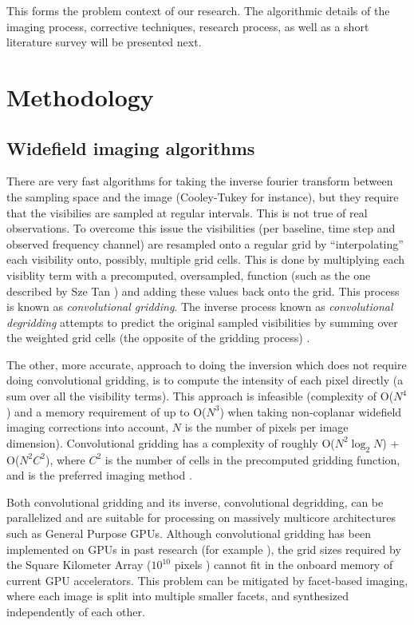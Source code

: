 \documentclass[a4paper, two column]{article}
\begin{document}
This forms the problem context of our research. The algorithmic details of the imaging process, corrective techniques, research process, as well as a short literature survey will be presented next.

\section{Methodology}
\subsection{Widefield imaging algorithms}
There are very fast algorithms for taking the inverse fourier transform between the sampling space and the image (Cooley-Tukey for instance), but they require that the visibilies are sampled at regular intervals. This 
is not true of real observations. To overcome this issue the visibilities (per baseline, time step and observed frequency channel) are resampled onto a regular grid by ``interpolating'' each visibility onto, possibly, 
multiple grid cells. This is done by multiplying each visiblity term with a precomputed, oversampled, function (such as the one described by Sze Tan \cite{tan1986aperture}) and adding these values back onto the grid. 
This process is known as \textit{convolutional gridding}. The inverse process known as \textit{convolutional degridding} attempts to predict the original sampled visibilities by summing over the weighted grid 
cells (the opposite of the gridding process) \cite{taylor1999synthesis}.

The other, more accurate, approach to doing the inversion which does not require doing convolutional gridding, is to compute the intensity of each pixel directly (a sum over all the visibility terms). This approach is infeasible
(complexity of O($N^4$) and a memory requirement of up to O($N^3$) when taking non-coplanar widefield imaging corrections into account, $N$ is the number of pixels per image dimension). Convolutional gridding has a complexity 
of roughly O($N^2\log_2{N}$) + O($N^2C^2$), where $C^2$ is the number of cells in the precomputed gridding function, and is the preferred imaging method \cite[Lecture 7]{taylor1999synthesis}.

Both convolutional gridding and its inverse, convolutional degridding, can be parallelized and are suitable for processing on massively multicore architectures such as General Purpose GPUs. Although convolutional gridding 
has been implemented on GPUs in past research (for example \cite{romein2012efficient}), the grid sizes required by the Square Kilometer Array ($10^{10}$ pixels \cite{cornwell2012wide}) cannot fit in the onboard memory 
of current GPU accelerators. This problem can be mitigated by facet-based imaging, where each image is split into multiple smaller facets, and synthesized independently of each other. 
\end{document}
